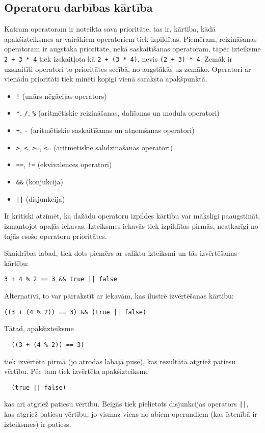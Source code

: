 \documentclass[12pt,a4paper]{report}
\begin{document}
\subsection{Operatoru darbības kārtība}

Katram operatoram ir noteikta sava prioritāte, tas ir, kārtība, kādā apakšizteiksmes ar vairākiem operatoriem tiek izpildītas. Piemēram, reizināšanas operatoram ir augstāka prioritāte, nekā saskaitīšanas operatoram, tāpēc izteiksme \texttt{2 + 3 * 4} tiek izskaitļota kā \texttt{2 + (3 * 4)}, nevis \texttt{(2 + 3) * 4}. 
Zemāk ir uzskaitīti operatori to prioritātes secībā, no augstākās uz zemāko. Operatori ar vienādu prioritāti tiek minēti kopīgi vienā saraksta apakšpunktā.

\begin{itemize}
  \item \texttt{!} (unārs nēgācijas operators)
  \item \texttt{*}, \texttt{/}, \texttt{\%} (aritmētiskie reizināšanas, dalīšanas un modula operatori)
  \item \texttt{+}, \texttt{-} (aritmētiskie saskaitīšanas un atņemšanas operatori)
  \item \texttt{>}, \texttt{<}, \texttt{>=}, \texttt{<=} (aritmētiskie salīdzināšanas operatori)
  \item \texttt{==}, \texttt{!=} (ekvivalences operatori)
  \item \texttt{\&\&} (konjukcija)
  \item \texttt{||} (disjunkcija) 
\end{itemize}

Ir kritiski atzīmēt, ka dažādu operatoru izpildes kārtību var mākslīgi paaugstināt, izmantojot apaļās iekavas. Izteiksmes iekavās tiek izpildītas pirmās, neatkarīgi no tajās esošo operatoru prioritātes.

Skaidrības labad, tiek dots piemērs ar saliktu izteiksmi un tās izvērtēšanas kārtību:
\begin{verbatim}
3 + 4 % 2 == 3 && true || false
\end{verbatim}

Alternatīvi, to var pārrakstīt ar iekavām, kas ilustrē izvērtēšanas kārtību:
\begin{verbatim}
((3 + (4 % 2)) == 3) && (true || false)
\end{verbatim}

Tātad, apakšizteiksme 
\begin{verbatim}
  ((3 + (4 % 2)) == 3)
\end{verbatim}
tiek izvērtēta pirmā (jo atrodas labajā pusē), kas rezultātā atgriež patiesu vērtību.
Pēc tam tiek izvērtēta apakšizteiksme
\begin{verbatim}  (true || false)
\end{verbatim}
kas arī atgriež patiesu vērtību. Beigās tiek pielietots disjunkcijas operators \texttt{||}, kas atgriež patiesu vērtību, jo vismaz viens no abiem operandiem (kas īstenībā ir izteiksmes) ir patiess.
\end{document}
